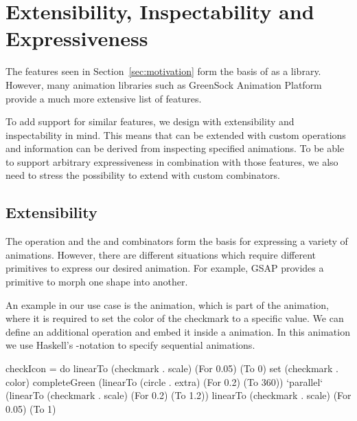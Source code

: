 \section{Extensibility, Inspectability and Expressiveness}
\label{sec:features}

The features seen in Section~\ref{sec:motivation} form the basis of \dsl{} as a library. However, many animation libraries such as GreenSock Animation Platform provide a much more extensive list of features.

To add support for similar features, we design \dsl{} with extensibility and inspectability in mind. This means that \dsl{} can be extended with custom operations and information can be derived from inspecting specified animations. To be able to support arbitrary expressiveness in combination with those features, we also need to stress the possibility to extend \dsl{} with custom combinators.

\subsection{Extensibility}
\label{sec:customop}

The  operation and the  and  combinators form the basis for expressing a variety of animations. However, there are different situations which require different primitives to express our desired animation. For example, GSAP provides a primitive to morph one shape into another.

An example in our use case is the  animation, which is part of the  animation, where it is required to set the color of the checkmark to a specific value. We can define an additional  operation and embed it inside a \dsl{} animation. In this animation we use Haskell's -notation to specify sequential animations.

\begin{spec}
checkIcon = do
  linearTo (checkmark . scale) (For 0.05) (To 0)
  set (checkmark . color) completeGreen
  (linearTo (circle . extra) (For 0.2) (To 360))
    `parallel`
    (linearTo (checkmark . scale) (For 0.2) (To 1.2))
  linearTo (checkmark . scale) (For 0.05) (To 1)
\end{spec}


